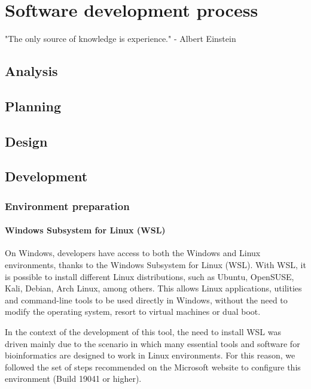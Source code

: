 \chapter{Software development process}
\label{chapter:Analysis tool}

\begin{introduction}
    "The only source of knowledge is experience." - Albert Einstein
\end{introduction}

\section{Analysis}

\section{Planning}

\section{Design}


\section{Development}
\subsection{Environment preparation }
\subsubsection{\textbf{Windows Subsystem for Linux (WSL)}}

On Windows, developers have access to both the Windows and Linux environments, thanks to the Windows Subsystem for Linux (WSL). With WSL, it is possible to install different Linux distributions, such as Ubuntu, OpenSUSE, Kali, Debian, Arch Linux, among others. This allows Linux applications, utilities and command-line tools to be used directly in Windows, without the need to modify the operating system, resort to virtual machines or dual boot. 

In the context of the development of this tool, the need to install WSL was driven mainly due to the scenario in which many essential tools and software for bioinformatics are designed to work in Linux environments. For this reason, we followed the set of steps recommended on the Microsoft website to configure this environment (Build 19041 or higher). \cite{wsl}


